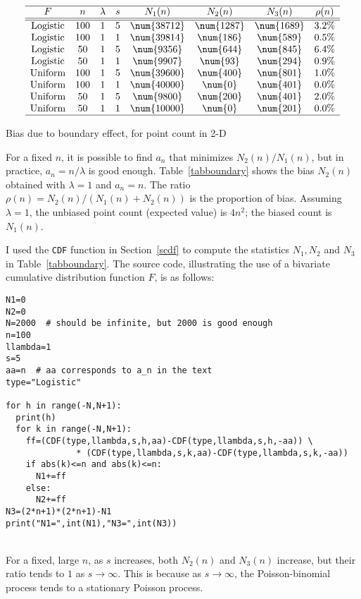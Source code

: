 \documentclass[10pt]{article}
\begin{document}
\begin{table}%
\[
\begin{array}{cccccccc}
\hline
 F &  n & \lambda & s  & N_1(n) & N_2(n) & N_3(n) & \rho(n)\\
\hline
\hline
\mbox{Logistic} & 100 & 1 & 5 & \num{38712} & \num{1287} &  \num{1689}  &  3.2\% \\
\mbox{Logistic} & 100 & 1 & 1 & \num{39814} & \num{186} &  \num{589}  &  0.5\% \\
\mbox{Logistic} & 50 & 1 & 5 & \num{9356} & \num{644} &  \num{845}  &  6.4\% \\
\mbox{Logistic} & 50 & 1 & 1 & \num{9907} & \num{93} &  \num{294}  &  0.9\% \\

\mbox{Uniform} & 100 & 1 & 5 & \num{39600} & \num{400} &  \num{801}  &  1.0\% \\
\mbox{Uniform} & 100 & 1 & 1 & \num{40000} & \num{0} &  \num{401}  &  0.0\% \\
\mbox{Uniform} & 50 & 1 & 5 & \num{9800} & \num{200} &  \num{401}  &  2.0\% \\
\mbox{Uniform} & 50 & 1 & 1 & \num{10000} & \num{0} &  \num{201}  &  0.0\% \\
\hline
\end{array}
\]
\caption{\label{tabboundary}Bias due to boundary effect, for point count in 2-D}
\end{table}

\noindent For a fixed $n$, it is possible to find $a_n$ that minimizes
$N_2(n)/N_1(n)$, but in practice, $a_n=n/\lambda$ is good enough. Table~\ref{tabboundary} shows the bias $N_2(n)$ obtained with $\lambda=1$ and $a_n=n$. 
The ratio $\rho(n)=N_2(n)/(N_1(n)+N_2(n))$ is the proportion of bias. Assuming $\lambda=1$, the unbiased point count (expected value) is $4n^2$; the biased count is $N_1(n)$.

I used the \texttt{CDF} function in Section~\ref{scdf} to compute the statistics $N_1, N_2$ and $N_3$ in Table~\ref{tabboundary}. The source code, illustrating the use of 
a bivariate cumulative distribution function $F$,  is as follows: \vspace{1ex}
\quad \\
\begin{lstlisting}
N1=0
N2=0
N=2000  # should be infinite, but 2000 is good enough
n=100
llambda=1
s=5
aa=n  # aa corresponds to a_n in the text
type="Logistic"

for h in range(-N,N+1): 
  print(h)
  for k in range(-N,N+1): 
    ff=(CDF(type,llambda,s,h,aa)-CDF(type,llambda,s,h,-aa)) \
              * (CDF(type,llambda,s,k,aa)-CDF(type,llambda,s,k,-aa))
    if abs(k)<=n and abs(k)<=n:
      N1+=ff 
    else: 
      N2+=ff 
N3=(2*n+1)*(2*n+1)-N1
print("N1=",int(N1),"N3=",int(N3)) 
\end{lstlisting}
\quad \\
\noindent  For a fixed, large $n$, as $s$ increases, both $N_2(n)$ and $N_3(n)$ increase, but their ratio tends to $1$ as $s\rightarrow\infty$. This is because
as $s\rightarrow\infty$, the Poisson-binomial process tends to a stationary Poisson process.
\end{document}
